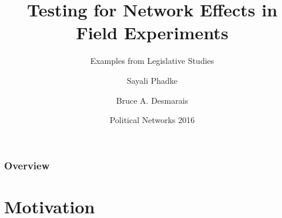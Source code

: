 \documentclass{beamer}
\title[Investigating spillover effects]{Testing for Network Effects in Field Experiments} %
\subtitle{Examples from Legislative Studies}
\author{Sayali Phadke\inst{1} \and Bruce A. Desmarais\inst{2}}
\institute[Pennsylvania State University] %
{
  \inst{1}%
  PhD student\\
  Department of Statistics
  \and
  \inst{2}%
  Associate Professor\\
  Department of Political Science}
\date{Political Networks 2016}
\begin{document}
\begin{frame}
\titlepage %
\end{frame}

\begin{frame}
\frametitle{Overview} %
\tableofcontents %
\end{frame}



\section{Motivation}



\end{document}
